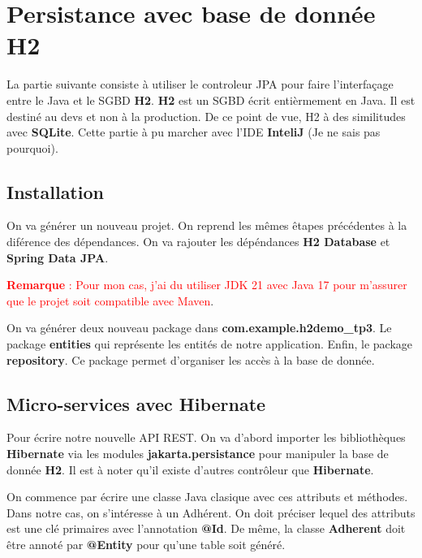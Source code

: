\documentclass{rapport}
\begin{document}
\section{Persistance avec base de donnée H2}

La partie suivante consiste à utiliser le controleur JPA pour faire l'interfaçage entre le Java et le SGBD \textbf{H2}. \textbf{H2} est un SGBD écrit entièrmement en Java. Il est destiné au devs et non à la production. De ce point de vue, H2 à des similitudes avec \textbf{SQLite}. Cette partie à pu marcher avec l'IDE \textbf{InteliJ} (Je ne sais pas pourquoi).

\subsection{Installation}

On va générer un nouveau projet. On reprend les mêmes êtapes précédentes à la diférence des dépendances. On va rajouter les dépéndances \textbf{H2 Database} et \textbf{Spring Data JPA}.

\textcolor{red}{\textbf{Remarque} : Pour mon cas, j'ai du utiliser JDK 21 avec Java 17 pour m'assurer que le projet soit compatible avec Maven}.\newline

On va générer deux nouveau package dans \textbf{com.example.h2demo\_tp3}. Le package \textbf{entities} qui représente les entités de notre application. Enfin, le package \textbf{repository}. Ce package permet d'organiser les accès à la base de donnée. 

\subsection{Micro-services avec Hibernate}

Pour écrire notre nouvelle API REST. On va d'abord importer les bibliothèques \textbf{Hibernate} via les modules  \textbf{jakarta.persistance} pour manipuler la base de donnée \textbf{H2}. Il est à noter qu'il existe d'autres contrôleur que \textbf{Hibernate}.\newline

On commence par écrire une classe Java clasique avec ces attributs et méthodes. Dans notre cas, on s'intéresse à un Adhérent. On doit préciser lequel des attributs est une clé primaires avec l'annotation \textbf{@Id}. De  même, la classe \textbf{Adherent} doit être annoté par \textbf{@Entity} pour qu'une table soit généré.\newline
\end{document}
